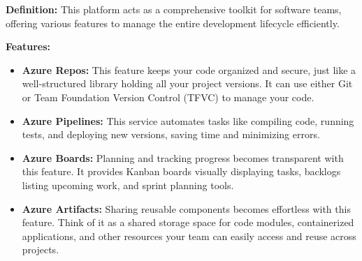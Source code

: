 \textbf{Definition:} This platform acts as a comprehensive toolkit for software teams, offering various features to manage the entire development lifecycle efficiently.
\par
\textbf{Features:}
\begin{itemize}
    \item \textbf{Azure Repos:} This feature keeps your code organized and secure, just like a well-structured library holding all your project versions. It can use either Git or Team Foundation Version Control (TFVC) to manage your code.
    \item \textbf{Azure Pipelines:}  This service automates tasks like compiling code, running tests, and deploying new versions, saving time and minimizing errors.
    \item \textbf{Azure Boards:} Planning and tracking progress becomes transparent with this feature. It provides Kanban boards visually displaying tasks, backlogs listing upcoming work, and sprint planning tools.
    \item \textbf{Azure Artifacts:} Sharing reusable components becomes effortless with this feature. Think of it as a shared storage space for code modules, containerized applications, and other resources your team can easily access and reuse across projects.
\end{itemize}
